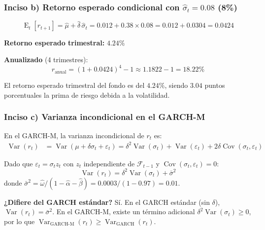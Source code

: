 \documentclass[12pt,a4paper]{article}
\DeclareMathOperator{\Var}{Var}
\DeclareMathOperator{\Cov}{Cov}
\DeclareMathOperator{\E}{E}
\begin{document}
\subsubsection*{Inciso b) Retorno esperado condicional con $\hat{\sigma}_t=0.08$ (8\%)}

\begin{solucion}
\begin{equation}
\E_t[r_{t+1}] = \hat{\mu} + \hat{\delta}\,\hat{\sigma}_t = 0.012 + 0.38\times 0.08 = 0.012 + 0.0304 = 0.0424
\end{equation}

\textbf{Retorno esperado trimestral:} $4.24\%$

\textbf{Anualizado} (4 trimestres):
\begin{equation}
r_{\text{anual}} = (1+0.0424)^4 - 1 \approx 1.1822 - 1 = 18.22\%
\end{equation}

El retorno esperado trimestral del fondo es del $4.24\%$, siendo $3.04$ puntos porcentuales la prima de riesgo debida a la volatilidad.
\end{solucion}

\subsubsection*{Inciso c) Varianza incondicional en el GARCH-M}

\begin{solucion}
En el GARCH-M, la varianza incondicional de $r_t$ es:
\begin{align*}
\Var(r_t) &= \Var(\mu + \delta\sigma_t + \varepsilon_t) = \delta^2\Var(\sigma_t) + \Var(\varepsilon_t) + 2\delta\Cov(\sigma_t,\varepsilon_t)
\end{align*}

Dado que $\varepsilon_t=\sigma_t z_t$ con $z_t$ independiente de $\mathcal{F}_{t-1}$ y $\Cov(\sigma_t,\varepsilon_t)=0$:
\begin{equation}
\Var(r_t) = \delta^2\Var(\sigma_t) + \bar{\sigma}^2
\end{equation}
donde $\bar{\sigma}^2=\hat{\omega}/(1-\hat{\alpha}-\hat{\beta})=0.0003/(1-0.97)=0.01$.

\textbf{¿Difiere del GARCH estándar?} Sí. En el GARCH estándar (sin $\delta$), $\Var(r_t)=\bar{\sigma}^2$. En el GARCH-M, existe un término adicional $\delta^2\Var(\sigma_t)\geq0$, por lo que $\Var_{\text{GARCH-M}}(r_t)\geq\Var_{\text{GARCH}}(r_t)$.
\end{solucion}
\end{document}
